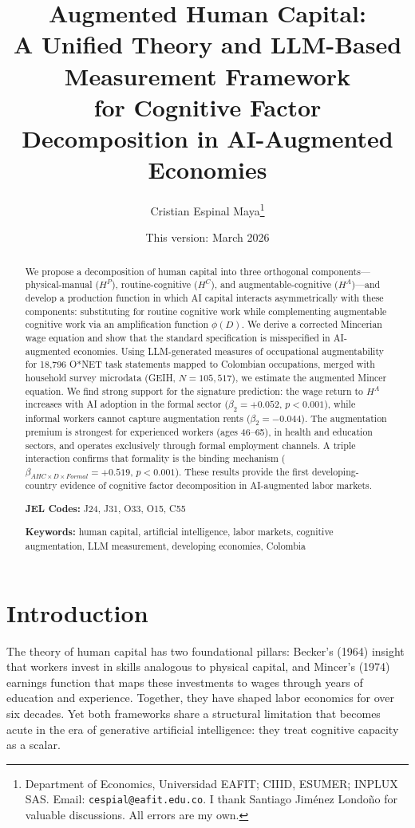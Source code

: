 \documentclass[12pt,a4paper]{article}
\title{Augmented Human Capital:\\A Unified Theory and LLM-Based Measurement Framework\\for Cognitive Factor Decomposition in AI-Augmented Economies}
\author{Cristian Espinal Maya\thanks{Department of Economics, Universidad EAFIT; CIIID, ESUMER; INPLUX SAS. Email: \texttt{cespial@eafit.edu.co}. I thank Santiago Jim\'enez Londo\~no for valuable discussions. All errors are my own.}}
\date{This version: March 2026}
\begin{document}
\maketitle

\begin{abstract}
We propose a decomposition of human capital into three orthogonal components---physical-manual ($H^P$), routine-cognitive ($H^C$), and augmentable-cognitive ($H^A$)---and develop a production function in which AI capital interacts asymmetrically with these components: substituting for routine cognitive work while complementing augmentable cognitive work via an amplification function $\phi(D)$. We derive a corrected Mincerian wage equation and show that the standard specification is misspecified in AI-augmented economies. Using LLM-generated measures of occupational augmentability for 18,796 O*NET task statements mapped to Colombian occupations, merged with household survey microdata (GEIH, $N=105{,}517$), we estimate the augmented Mincer equation. We find strong support for the signature prediction: the wage return to $H^A$ increases with AI adoption in the formal sector ($\beta_2 = +0.052$, $p < 0.001$), while informal workers cannot capture augmentation rents ($\beta_2 = -0.044$). The augmentation premium is strongest for experienced workers (ages 46--65), in health and education sectors, and operates exclusively through formal employment channels. A triple interaction confirms that formality is the binding mechanism ($\beta_{AHC \times D \times Formal} = +0.519$, $p < 0.001$). These results provide the first developing-country evidence of cognitive factor decomposition in AI-augmented labor markets.

\bigskip
\noindent\textbf{JEL Codes:} J24, J31, O33, O15, C55

\bigskip
\noindent\textbf{Keywords:} human capital, artificial intelligence, labor markets, cognitive augmentation, LLM measurement, developing economies, Colombia
\end{abstract}

\newpage

\section{Introduction}
\label{sec:intro}

The theory of human capital has two foundational pillars: Becker's (1964) insight that workers invest in skills analogous to physical capital, and Mincer's (1974) earnings function that maps these investments to wages through years of education and experience. Together, they have shaped labor economics for over six decades. Yet both frameworks share a structural limitation that becomes acute in the era of generative artificial intelligence: they treat cognitive capacity as a scalar.
\end{document}
